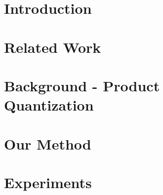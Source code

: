 \documentclass{article}  %
\begin{document}
\section{Introduction} \label{sec:intro}



\vspace{-1.5mm}
\section{Related Work} \label{sec:relatedWork}
\vspace{-.5mm}


% 

\vspace{-1.5mm}
\section{Background - Product Quantization} \label{sec:background}
\vspace{-.5mm}



\vspace{-3mm}
\section{Our Method} \label{sec:method}
\vspace{-.5mm}



\vspace{-2mm}
\section{Experiments} \label{sec:results}
\end{document}
